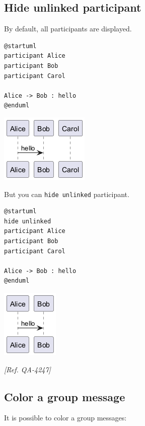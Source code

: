 \subsection{Hide unlinked participant }


By default, all participants are displayed.
\begin{verbatim}
@startuml
participant Alice
participant Bob
participant Carol

Alice -> Bob : hello
@enduml
\end{verbatim}
\begin{center}
\includegraphics[scale=0.60]{imgw/img-72c891647a1c57f2b3dbff2dd4c4dd3d.png}
\end{center}


But you can \texttt{hide unlinked} participant.
\begin{verbatim}
@startuml
hide unlinked
participant Alice
participant Bob
participant Carol

Alice -> Bob : hello
@enduml
\end{verbatim}
\begin{center}
\includegraphics[scale=0.60]{imgw/img-b4609c8640dca71bb65b86ae4a34c3d8.png}
\end{center}




\textit{[Ref. QA-4247]}
%
%
\subsection{Color a group message}




It is possible to color a group messages:


